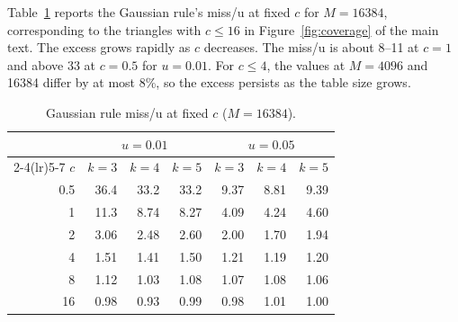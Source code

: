 Table~\ref{tab:gauss-c} reports the Gaussian rule's miss/u at fixed $c$ for $M=16384$, corresponding to the triangles with $c\le16$ in Figure~\ref{fig:coverage} of the main text. The excess grows rapidly as $c$ decreases. The miss/u is about 8--11 at $c=1$ and above 33 at $c=0.5$ for $u=0.01$. For $c\le4$, the values at $M=4096$ and 16384 differ by at most 8\%, so the excess persists as the table size grows.

\begin{table}[!htbp]
\centering
\caption{Gaussian rule miss/u at fixed $c$ ($M=16384$).}
\label{tab:gauss-c}
\begin{tabular}{rrrrrrr}
\toprule
& \multicolumn{3}{c}{$u=0.01$} & \multicolumn{3}{c}{$u=0.05$}\\
\cmidrule(lr){2-4}\cmidrule(lr){5-7}
$c$ & $k=3$ & $k=4$ & $k=5$ & $k=3$ & $k=4$ & $k=5$\\
\midrule
0.5 & 36.4 & 33.2 & 33.2 & 9.37 & 8.81 & 9.39\\
1 & 11.3 & 8.74 & 8.27 & 4.09 & 4.24 & 4.60\\
2 & 3.06 & 2.48 & 2.60 & 2.00 & 1.70 & 1.94\\
4 & 1.51 & 1.41 & 1.50 & 1.21 & 1.19 & 1.20\\
8 & 1.12 & 1.03 & 1.08 & 1.07 & 1.08 & 1.06\\
16 & 0.98 & 0.93 & 0.99 & 0.98 & 1.01 & 1.00\\
\bottomrule
\end{tabular}
\end{table}


